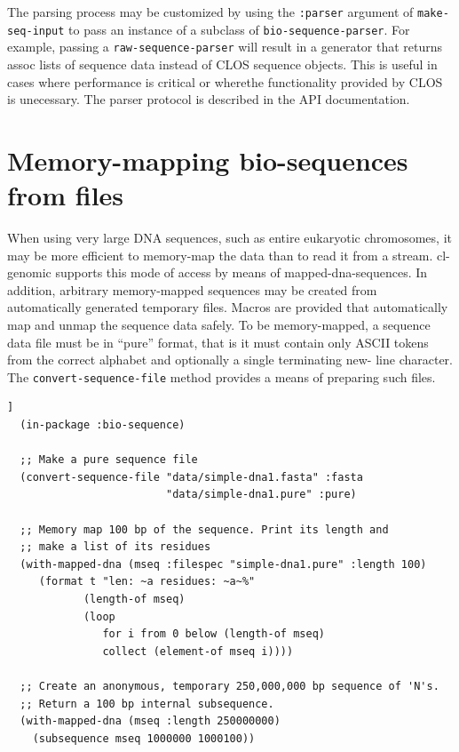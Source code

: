 \documentclass[a4paper, 12pt]{article}
\begin{document}
The parsing process may be customized by using the \lstinline!:parser!
argument of \lstinline!make-seq-input! to pass an instance of a
subclass of \lstinline!bio-sequence-parser!. For example, passing a
\lstinline!raw-sequence-parser!  will result in a generator that
returns assoc lists of sequence data instead of CLOS sequence objects.
This is useful in cases where performance is critical or wherethe
functionality provided by CLOS is unecessary. The parser protocol is
described in the API documentation.


\section{Memory-mapping bio-sequences from files}
\label{sec:memory-map-bioseq}

When using very large DNA sequences, such as entire eukaryotic
chromosomes, it may be more efficient to memory-map the data than to
read it from a stream. cl-genomic supports this mode of access by
means of mapped-dna-sequences. In addition, arbitrary memory-mapped
sequences may be created from automatically generated temporary
files. Macros are provided that automatically map and unmap the
sequence data safely.  To be memory-mapped, a sequence data file must
be in ``pure'' format, that is it must contain only ASCII tokens from
the correct alphabet and optionally a single terminating new- line
character. The \lstinline!convert-sequence-file! method provides a
means of preparing such files.



\begin{lstlisting}[caption={Memory-mapping a bio-sequence},
  label=lst:read-bioseq-stream,float=[tbph]]
  (in-package :bio-sequence)

  ;; Make a pure sequence file
  (convert-sequence-file "data/simple-dna1.fasta" :fasta
                         "data/simple-dna1.pure" :pure)

  ;; Memory map 100 bp of the sequence. Print its length and
  ;; make a list of its residues
  (with-mapped-dna (mseq :filespec "simple-dna1.pure" :length 100)
     (format t "len: ~a residues: ~a~%"
            (length-of mseq)
            (loop
               for i from 0 below (length-of mseq)
               collect (element-of mseq i))))

  ;; Create an anonymous, temporary 250,000,000 bp sequence of 'N's.
  ;; Return a 100 bp internal subsequence.
  (with-mapped-dna (mseq :length 250000000)
    (subsequence mseq 1000000 1000100))
\end{lstlisting}
\end{document}
